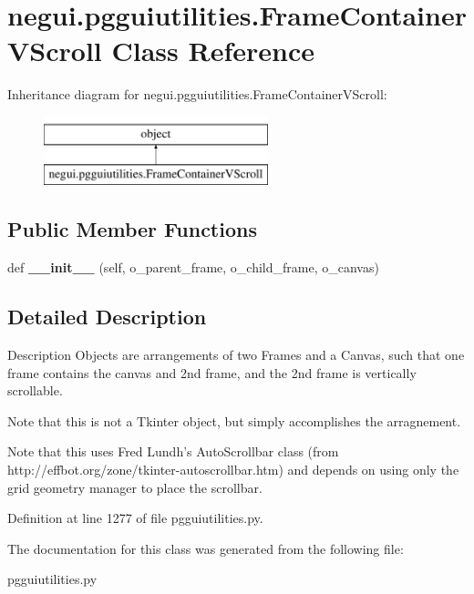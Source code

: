 \hypertarget{classnegui_1_1pgguiutilities_1_1FrameContainerVScroll}{}\section{negui.\+pgguiutilities.\+Frame\+Container\+V\+Scroll Class Reference}
\label{classnegui_1_1pgguiutilities_1_1FrameContainerVScroll}
Inheritance diagram for negui.\+pgguiutilities.\+Frame\+Container\+V\+Scroll\+:\begin{figure}[H]
\begin{center}
\leavevmode
\includegraphics[height=2.000000cm]{classnegui_1_1pgguiutilities_1_1FrameContainerVScroll}
\end{center}
\end{figure}
\subsection*{Public Member Functions}
\begin{DoxyCompactItemize}
\item 
def {\bfseries \+\_\+\+\_\+init\+\_\+\+\_\+} (self, o\+\_\+parent\+\_\+frame, o\+\_\+child\+\_\+frame, o\+\_\+canvas)\hypertarget{classnegui_1_1pgguiutilities_1_1FrameContainerVScroll_a77671bf20cb4175f0788de78bda3445f}{}\label{classnegui_1_1pgguiutilities_1_1FrameContainerVScroll_a77671bf20cb4175f0788de78bda3445f}

\end{DoxyCompactItemize}


\subsection{Detailed Description}
\begin{DoxyVerb}Description
Objects are arrangements of two Frames and a 
Canvas, such that one frame contains the 
canvas and 2nd frame, and the 2nd frame 
is vertically scrollable.

Note that this is not a Tkinter object, but
simply accomplishes the arragnement. 

Note that this uses Fred Lundh's AutoScrollbar class
(from http://effbot.org/zone/tkinter-autoscrollbar.htm)
and depends on using only the grid geometry manager to place
the scrollbar.
\end{DoxyVerb}
 

Definition at line 1277 of file pgguiutilities.\+py.



The documentation for this class was generated from the following file\+:\begin{DoxyCompactItemize}
\item 
pgguiutilities.\+py\end{DoxyCompactItemize}
